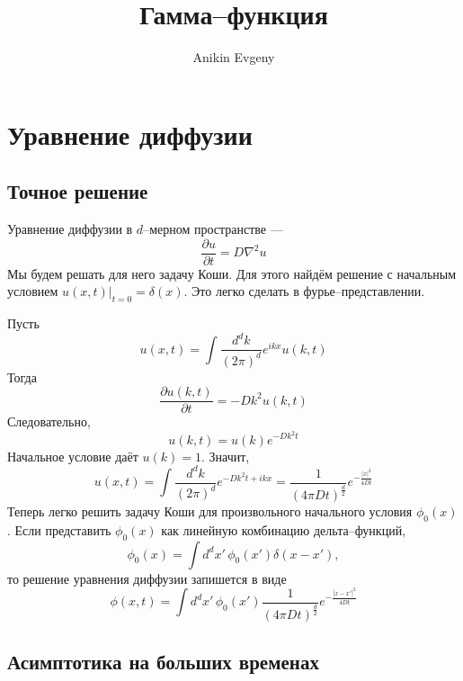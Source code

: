 \documentclass{article}
\title{Гамма--функция}
\author{Anikin Evgeny}
\begin{document}
\maketitle
\section{Уравнение диффузии}
\subsection{Точное решение}
Уравнение диффузии в $d$--мерном пространстве ---
\begin{equation}
   \frac{\partial u}{\partial t} = D\nabla^2 u
\end{equation}
Мы будем решать для него задачу Коши. Для этого найдём решение с начальным условием
$u(x,t)|_{t=0} = \delta(x)$. Это легко сделать в фурье--представлении.

Пусть
\begin{equation}
   u(x,t) = \int \frac{d^d k}{(2\pi)^d} e^{ikx} u(k,t)
\end{equation}
Тогда 
\begin{equation}
    \frac{\partial u(k,t)}{\partial t} = -Dk^2 u(k,t)
\end{equation}
Следовательно,
\begin{equation}
    u(k,t) = u(k) e^{-Dk^2 t}
\end{equation}
Начальное условие даёт $u(k) = 1$. Значит, 
\begin{equation}
   u(x,t) = \int \frac{d^d k}{(2\pi)^d} e^{-Dk^2t + ikx} = 
                \frac{1}{(4\pi Dt)^{\frac{d}{2}}} e^{-\frac{|x|^2}{4Dt}}
\end{equation}
Теперь легко решить задачу Коши для произвольного начального условия $\phi_0(x)$. Если 
представить $\phi_0(x)$ как линейную комбинацию дельта--функций,
\begin{equation}
    \phi_0(x) = \int d^dx'\, \phi_0(x') \delta(x - x'),
\end{equation}
то решение уравнения диффузии запишется в виде
\begin{equation}
    \phi(x,t) = \int d^dx'\, \phi_0(x') 
            \frac{1}{(4\pi Dt)^{\frac{d}{2}}} e^{-\frac{|x - x'|^2}{4Dt}}
\end{equation}
\subsection{Асимптотика на больших временах}
\end{document}
